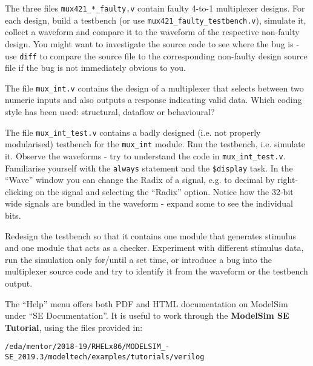 \documentclass[a4paper,11pt]{article}
\begin{document}
\smallskip

The three files \verb#mux421_*_faulty.v# contain faulty 4-to-1 multiplexer
designs.  For each design, build a testbench (or use
\verb#mux421_faulty_testbench.v#), simulate it, collect a waveform and compare
it to the waveform of the respective non-faulty design. You might want to
investigate the source code to see where the bug is - use \verb#diff# to
compare the source file to the corresponding non-faulty design source file if
the bug is not immediately obvious to you.

\smallskip
{}
\smallskip

The file \verb#mux_int.v# contains the design of a multiplexer that selects
between two numeric inputs and also outputs a response indicating valid data.
Which coding style has been used: structural, dataflow or behavioural?

The file \verb#mux_int_test.v# contains a badly designed (i.e. not properly
modularised) testbench for the \verb#mux_int# module. Run the testbench, i.e.
simulate it. Observe the waveforms - try to understand the code in
\verb#mux_int_test.v#. Familiarise yourself with the \verb#always# statement
and the \verb#$display# task. In the ``Wave'' window you can change the
Radix of a signal, e.g. to decimal by right-clicking on the signal and
selecting the ``Radix'' option. Notice how the 32-bit wide signals are bundled
in the waveform - expand some to see the individual bits.

Redesign the testbench so that it contains one module that generates stimulus
and one module that acts as a checker. Experiment with different stimulus data,
run the simulation only for/until a set time, or introduce a bug into the
multiplexer source code and try to identify it from the waveform or the
testbench output.

\smallskip
{}
\smallskip

The ``Help'' menu offers both PDF and HTML documentation on ModelSim under ``SE
Documentation''. It is useful to work through the {\bf ModelSim SE Tutorial},
using the files provided in:
\smallskip

{\small
\verb#/eda/mentor/2018-19/RHELx86/MODELSIM_-SE_2019.3/modeltech/examples/tutorials/verilog#
}
\end{document}
